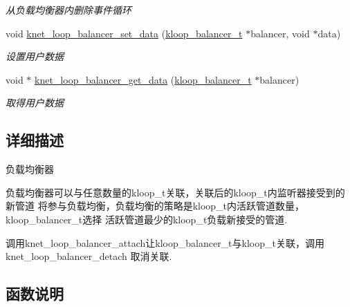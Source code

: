\begin{DoxyCompactItemize}
\begin{DoxyCompactList}\small\item\em 从负载均衡器内删除事件循环 \end{DoxyCompactList}\item 
void \hyperlink{a00118_ga476aeb9c1ab507c2af581b9ceb66b261_ga476aeb9c1ab507c2af581b9ceb66b261}{knet\+\_\+loop\+\_\+balancer\+\_\+set\+\_\+data} (\hyperlink{a00056_abd3f964265beb2f8984e76f44fb5ea33_abd3f964265beb2f8984e76f44fb5ea33}{kloop\+\_\+balancer\+\_\+t} $\ast$balancer, void $\ast$data)
\begin{DoxyCompactList}\small\item\em 设置用户数据 \end{DoxyCompactList}\item 
void $\ast$ \hyperlink{a00118_gaf4fab99f76529f2381418ff4f0692a68_gaf4fab99f76529f2381418ff4f0692a68}{knet\+\_\+loop\+\_\+balancer\+\_\+get\+\_\+data} (\hyperlink{a00056_abd3f964265beb2f8984e76f44fb5ea33_abd3f964265beb2f8984e76f44fb5ea33}{kloop\+\_\+balancer\+\_\+t} $\ast$balancer)
\begin{DoxyCompactList}\small\item\em 取得用户数据 \end{DoxyCompactList}\end{DoxyCompactItemize}


\subsection{详细描述}
负载均衡器 


\begin{DoxyPre}
负载均衡器可以与任意数量的kloop\_t关联，关联后的kloop\_t内监听器接受到的新管道
将参与负载均衡，负载均衡的策略是kloop\_t内活跃管道数量，kloop\_balancer\_t选择
活跃管道最少的kloop\_t负载新接受的管道.\end{DoxyPre}



\begin{DoxyPre}调用knet\_loop\_balancer\_attach让kloop\_balancer\_t与kloop\_t关联，调用knet\_loop\_balancer\_detach
取消关联.
\end{DoxyPre}
 

\subsection{函数说明}
\hypertarget{a00118_ga647f8a2d39c97c8759f8768ebc612b98_ga647f8a2d39c97c8759f8768ebc612b98}{}
